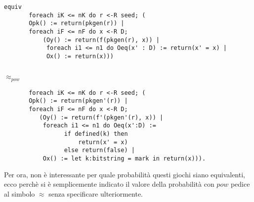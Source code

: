 \documentclass[a4paper,openright,twoside,12pt]{report}
\begin{document}
\begin{verbatim}
equiv 
       foreach iK <= nK do r <-R seed; (
       Opk() := return(pkgen(r)) |
       foreach iF <= nF do x <-R D;
           (Oy() := return(f(pkgen(r), x)) |
            foreach i1 <= n1 do Oeq(x' : D) := return(x' = x) |
            Ox() := return(x)))
   
\end{verbatim}
\texttt{$\approx _{pow}$} 
\begin{verbatim}       
       foreach iK <= nK do r <-R seed; (
       Opk() := return(pkgen'(r)) |
       foreach iF <= nF do x <-R D;
          (Oy() := return(f'(pkgen'(r), x)) |
           foreach i1 <= n1 do Oeq(x':D) :=
                 if defined(k) then 
                     return(x' = x) 
                 else return(false) |
           Ox() := let k:bitstring = mark in return(x))).
 \end{verbatim}
Per ora, non \`e interessante per quale probabilit\`a questi giochi siano equivalenti, ecco perch\`e si \`e semplicemente indicato il valore della probabilit\`a con $pow$ pedice al simbolo $\approx$ 
senza specificare ulteriormente.
\end{document}
